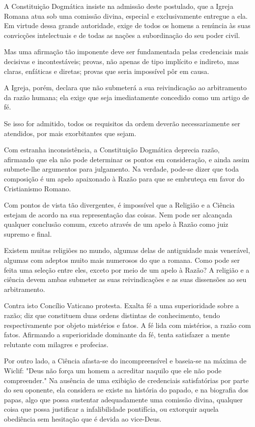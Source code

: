 \documentclass[11pt,a5paper,twoside,openany]{book}
\begin{document}
A Constituição Dogmática insiste na admissão deste postulado, que a Igreja Romana atua sob uma comissão divina, especial e exclusivamente entregue a ela. Em virtude dessa grande autoridade, exige de todos os homens a renúncia às suas convicções intelectuais e de todas as nações a subordinação do seu poder civil.

Mas uma afirmação tão imponente deve ser fundamentada pelas credenciais mais decisivas e incontestáveis; provas, não apenas de tipo implícito e indireto, mas claras, enfáticas e diretas; provas que seria impossível pôr em causa.

A Igreja, porém, declara que não submeterá a sua reivindicação ao arbitramento da razão humana; ela exige que seja imediatamente concedido como um artigo de fé.

Se isso for admitido, todos os requisitos da ordem deverão necessariamente ser atendidos, por mais exorbitantes que sejam.

Com estranha inconsistência, a Constituição Dogmática deprecia razão, afirmando que ela não pode determinar os pontos em consideração, e ainda assim submete-lhe argumentos para julgamento. Na verdade, pode-se dizer que toda composição é um apelo apaixonado à Razão para que se embruteça em favor do Cristianismo Romano.

Com pontos de vista tão divergentes, é impossível que a Religião e a Ciência estejam de acordo na sua representação das coisas. Nem pode ser alcançada qualquer conclusão comum, exceto através de um apelo à Razão como juiz supremo e final.

Existem muitas religiões no mundo, algumas delas de antiguidade mais venerável, algumas com adeptos muito mais numerosos do que a romana. Como pode ser feita uma seleção entre eles, exceto por meio de um apelo à Razão? A religião e a ciência devem ambas submeter as suas reivindicações e as suas dissensões ao seu arbitramento.

Contra isto Concílio Vaticano protesta. Exalta fé a uma superioridade sobre a razão; diz que constituem duas ordens distintas de conhecimento, tendo respectivamente por objeto mistérios e fatos. A fé lida com mistérios, a razão com fatos. Afirmando a superioridade dominante da fé, tenta satisfazer a mente relutante com milagres e profecias.

Por outro lado, a Ciência afasta-se do incompreensível e baseia-se na máxima de Wiclif: "Deus não força um homem a acreditar naquilo que ele não pode compreender." Na ausência de uma exibição de credenciais satisfatórias por parte do seu oponente, ela considera se existe na história do papado, e na biografia dos papas, algo que possa sustentar adequadamente uma comissão divina, qualquer coisa que possa justificar a infalibilidade pontifícia, ou extorquir aquela obediência sem hesitação que é devida ao vice-Deus.
\end{document}
